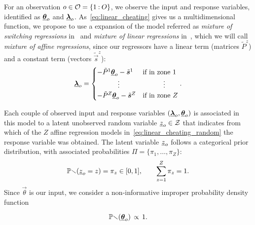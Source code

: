 \documentclass{ifacconf}  %
\begin{document}
For an observation ${o\in\mathcal{O}=\{1\mathbin{:}O\}}$, we observe the input and response variables, identified as  ${\underline{\boldsymbol{\theta}}_{o}}$ and ${\underline{\boldsymbol{\lambda}}_{o}}$.
As~\eqref{eq:linear_cheating} gives us a multidimensional \pwa{} function, we propose to use a expansion of the model referred as \emph{mixture of switching regressions} in~\cite{QuandtRamsey1978} and \emph{mixture of linear regressions} in~\cite{FariaSoromenho2010}, which we will call \emph{mixture of affine regressions}, since our regressors have a linear term (matrices $\tilde{P}^{z}$) and a constant term (vectors $\tilde{\vec{s}}^{z}$):
\begin{equation}
  \label{eq:linear_cheating_random}
  {\underline{\boldsymbol{\lambda}}}_{o}=
  \begin{cases}
    -\tilde{P}^{1}{\underline{\boldsymbol{\theta}}}_{o}-\tilde{\boldsymbol{s}}^{1}&\text{if in zone } 1\\
    \qquad\quad \vdots&\qquad\quad \vdots\\
    -\tilde{P}^{Z}{\underline{\boldsymbol{\theta}}}_{o}-\tilde{\boldsymbol{s}}^{Z}&\text{if in zone } Z\\
  \end{cases}.
\end{equation}

Each couple of observed input and response variables $(    {\underline{\boldsymbol{\lambda}}}_{o}, {\underline{\boldsymbol{\theta}}}_{o})$ is associated in this model to a latent unobserved random variable ${\underline{z}_{o}\in\mathcal{Z}}$ that indicates from which of the $Z$ affine regression models in~\eqref{eq:linear_cheating_random} the response variable was obtained.
The latent variable $\underline{z}_{o}$ follows a categorical prior distribution, with associated probabilities ${\Pi=\{\pi_{1},\dots,\pi_{Z}\}}$:
   \begin{equation}
     \label{eq:prob_zo_equal_z}
\mathbb{Pr}(\underline{z}_{o}=z)=\pi_{z} \in [0,1], \qquad \sum_{z=1}^{Z} \pi_{z} = 1.
\end{equation}
Since $\vec{\theta}$ is our input,
we consider a non-informative improper probability density function~\cite{ChristensenEtAl2010}

\begin{equation}
  \label{eq:theta_almost_surely}
  \mathbb{Pr}({\underline{\boldsymbol{\theta}}}_{o}) \,\propto \,1.
\end{equation}
\end{document}
